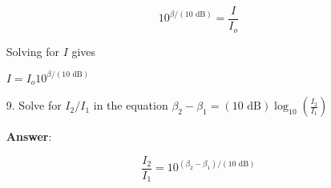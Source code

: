\documentclass{article}
\begin{document}
\begin{enumerate}
            $$10^{\beta/(10 \text{ dB})} = \frac{I}{I_o}$$

            Solving for $I$ gives   

            $I=I_o 10^{\beta/(10\text{ dB})}$
            \else
            \vskip 96pt
            \fi

  \item[9.] Solve for $I_2/I_1$ in the equation $\beta_2-\beta_1 = (10 \text{ dB})\log_{10}\left(\frac{I_2}{I_1}\right)$

            \ifsolutions
            \textbf{Answer}:

            $$\frac{I_2}{I_1}=10^{(\beta_2-\beta_1)/(10\text{ dB})}$$
            \else
            \vskip 96pt
            \fi

\end{enumerate}
\end{document}
